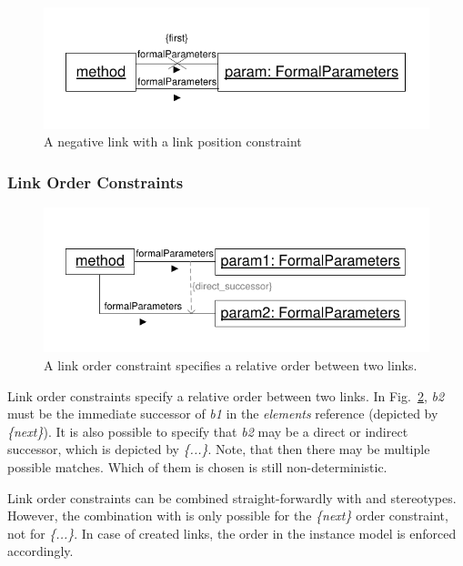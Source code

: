 {\begin{figure}[htbp]
\center
\includegraphics[width=0.75\columnwidth]{figures/LinkPositionConstraintNegated}
\caption{A negative link with a  link position constraint}
\label{fig:linkPositionConstraintNegative}
\end{figure}



\subsubsection{Link Order Constraints}
\label{sec:StoryPatterns:linkConstraints:orderConstraint}


\begin{figure}[htbp]
\center
\includegraphics[width=0.75\columnwidth]{figures/LinkOrderConstraintDirectSuccessor}
\caption{A link order constraint specifies a relative order between two links.}
\label{fig:linkOrderConstraints:linkOrderConstaint1}
\end{figure}

Link order constraints specify a relative order between two links. In Fig.~\ref{fig:linkOrderConstraints:linkOrderConstaint1}, \emph{b2} must be the immediate successor of \emph{b1} in the \emph{elements} reference (depicted by \emph{\{next\}}). It is also possible to specify that \emph{b2} may be a direct or indirect successor, which is depicted by \emph{\{...\}}. Note, that then there may be multiple possible matches. Which of them is chosen is still non-deterministic.

Link order constraints can be combined straight-forwardly with \create and \destroy stereotypes. However, the combination with \create is only possible for the \emph{\{next\}} order constraint, not for \emph{\{...\}}. In case of created links, the order in the instance model is enforced accordingly.

}
